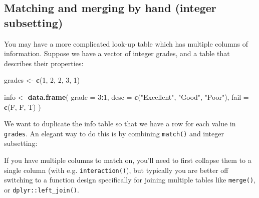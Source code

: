 \documentclass[]{book}
\newenvironment{Shaded}{\begin{snugshade}}{\end{snugshade}}
\newcommand{\KeywordTok}[1]{\textcolor[rgb]{0.13,0.29,0.53}{\textbf{#1}}}
\newcommand{\DataTypeTok}[1]{\textcolor[rgb]{0.13,0.29,0.53}{#1}}
\newcommand{\DecValTok}[1]{\textcolor[rgb]{0.00,0.00,0.81}{#1}}
\newcommand{\StringTok}[1]{\textcolor[rgb]{0.31,0.60,0.02}{#1}}
\newcommand{\CommentTok}[1]{\textcolor[rgb]{0.56,0.35,0.01}{\textit{#1}}}
\newcommand{\OperatorTok}[1]{\textcolor[rgb]{0.81,0.36,0.00}{\textbf{#1}}}
\newcommand{\NormalTok}[1]{#1}
\theoremstyle{definition}
\theoremstyle{definition}
\theoremstyle{definition}
\theoremstyle{remark}
\begin{document}
\subsection{Matching and merging by hand (integer
subsetting)}\label{matching-and-merging-by-hand-integer-subsetting}

You may have a more complicated look-up table which has multiple columns
of information. Suppose we have a vector of integer grades, and a table
that describes their properties:

\begin{Shaded}
\begin{Highlighting}[]
\NormalTok{grades <-}\StringTok{ }\KeywordTok{c}\NormalTok{(}\DecValTok{1}\NormalTok{, }\DecValTok{2}\NormalTok{, }\DecValTok{2}\NormalTok{, }\DecValTok{3}\NormalTok{, }\DecValTok{1}\NormalTok{)}

\NormalTok{info <-}\StringTok{ }\KeywordTok{data.frame}\NormalTok{(}
  \DataTypeTok{grade =} \DecValTok{3}\OperatorTok{:}\DecValTok{1}\NormalTok{,}
  \DataTypeTok{desc =} \KeywordTok{c}\NormalTok{(}\StringTok{"Excellent"}\NormalTok{, }\StringTok{"Good"}\NormalTok{, }\StringTok{"Poor"}\NormalTok{),}
  \DataTypeTok{fail =} \KeywordTok{c}\NormalTok{(F, F, T)}
\NormalTok{)}
\end{Highlighting}
\end{Shaded}

We want to duplicate the info table so that we have a row for each value
in \texttt{grades}. An elegant way to do this is by combining
\texttt{match()} and integer subsetting:

\begin{Shaded}
\end{Shaded}

If you have multiple columns to match on, you'll need to first collapse
them to a single column (with e.g. \texttt{interaction()}), but
typically you are better off switching to a function design specifically
for joining multiple tables like \texttt{merge()}, or
\texttt{dplyr::left\_join()}.
\end{document}
